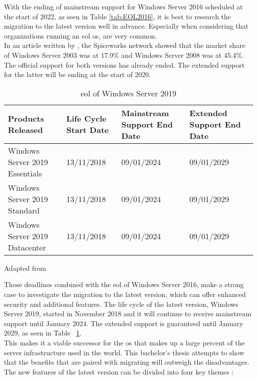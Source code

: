 With the ending of mainstream support for Windows Server 2016 scheduled at the start of 2022, as seen in Table \ref{tab:EOL2016}, it is best to research the migration to the latest version well in advance. 
Especially when considering that organizations running an \acrfull{eol} \acrshort{os}, are very common. \\
In an article written by \textcite{Tsai2016}, the Spiceworks network showed that the market share of Windows Server 2003 was at 17.9\% and Windows Server 2008 was at 45.4\%. 
The official support for both versions has already ended. The extended support for the latter will be ending at the start of 2020. 

\begin{table}[ht]
	\centering
	\begin{adjustbox}{width=1\textwidth}
		\begin{tabular}{l|l|l|ll}
			Products Released & Life Cycle Start Date & Mainstream Support End Date & Extended Support End Date &\\
			\hline
			Windows Server 2019 Essentials & 13/11/2018 & 09/01/2024 & 09/01/2029 &\\
			Windows Server 2019 Standard & 13/11/2018 & 09/01/2024 & 09/01/2029 &\\
			Windows Server 2019 Datacenter & 13/11/2018 & 09/01/2024 & 09/01/2029 &\\
		\end{tabular}
	\end{adjustbox}
	\caption[\acrshort{eol} \acrshort{ws}2019]{\acrshort{eol} of Windows Server 2019}
	\scriptsize	
	Adapted from \cite{MicrosoftEOL2019}
	\label{tab:EOL2019}
\end{table}

Those deadlines combined with the \acrshort{eol} of Windows Server 2016, make a strong case to investigate the migration to the latest version, which can offer enhanced security and additional features. 
The life cycle of the latest version, Windows Server 2019, started in November 2018 and it will continue to receive mainstream support until January 2024. 
The extended support is guaranteed until January 2029, as seen in Table ~\ref{tab:EOL2019}.\\
This makes it a viable successor for the \acrshort{os} that makes up a large percent of the server infrastructure used in the world. 
This bachelor's thesis attempts to show that the benefits that are paired with migrating will outweigh the disadvantages. 
The new features of the latest version can be divided into four key themes \autocite{MWST2018}:

